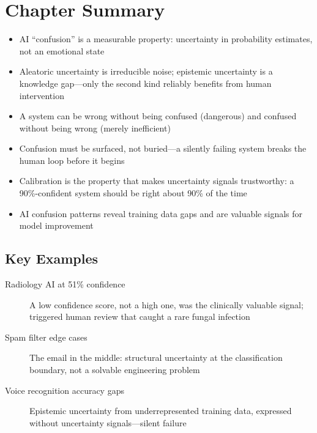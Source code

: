 \section*{Chapter Summary}

\begin{keyconcept}
\begin{itemize}
    \item AI ``confusion'' is a measurable property: uncertainty in probability estimates, not an emotional state
    \item Aleatoric uncertainty is irreducible noise; epistemic uncertainty is a knowledge gap---only the second kind reliably benefits from human intervention
    \item A system can be wrong without being confused (dangerous) and confused without being wrong (merely inefficient)
    \item Confusion must be surfaced, not buried---a silently failing system breaks the human loop before it begins
    \item Calibration is the property that makes uncertainty signals trustworthy: a 90\%-confident system should be right about 90\% of the time
    \item AI confusion patterns reveal training data gaps and are valuable signals for model improvement
\end{itemize}
\end{keyconcept}

\subsection*{Key Examples}

\begin{description}
    \item[Radiology AI at 51\% confidence] A low confidence score, not a high one, was the clinically valuable signal; triggered human review that caught a rare fungal infection
    \item[Spam filter edge cases] The email in the middle: structural uncertainty at the classification boundary, not a solvable engineering problem
    \item[Voice recognition accuracy gaps] Epistemic uncertainty from underrepresented training data, expressed without uncertainty signals---silent failure
\end{description}

